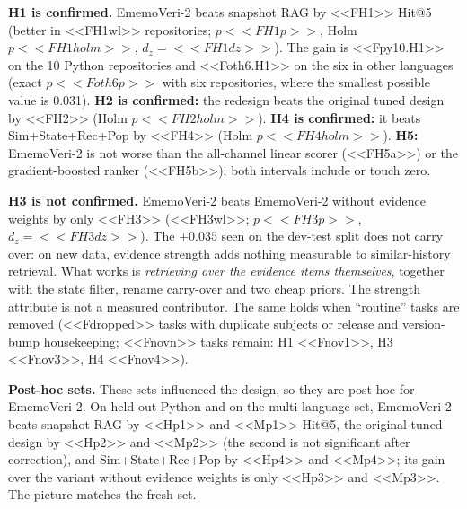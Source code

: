 \documentclass[conference]{IEEEtran}
\newcommand{\sys}{EmemoVeri}
\begin{document}
\textbf{H1 is confirmed.} \sys{}-2 beats snapshot RAG by <<FH1>> Hit@5 (better in <<FH1wl>> repositories; $p<<FH1p>>$, Holm $p<<FH1holm>>$, $d_z=<<FH1dz>>$). The gain is <<Fpy10.H1>> on the 10 Python repositories and <<Foth6.H1>> on the six in other languages (exact $p<<Foth6p>>$ with six repositories, where the smallest possible value is 0.031). \textbf{H2 is confirmed:} the redesign beats the original tuned design by <<FH2>> (Holm $p<<FH2holm>>$). \textbf{H4 is confirmed:} it beats Sim+State+Rec+Pop by <<FH4>> (Holm $p<<FH4holm>>$). \textbf{H5:} \sys{}-2 is not worse than the all-channel linear scorer (<<FH5a>>) or the gradient-boosted ranker (<<FH5b>>); both intervals include or touch zero.

\textbf{H3 is not confirmed.} \sys{}-2 beats \sys{}-2 without evidence weights by only <<FH3>> (<<FH3wl>>; $p<<FH3p>>$, $d_z=<<FH3dz>>$). The $+0.035$ seen on the dev-test split does not carry over: on new data, evidence strength adds nothing measurable to similar-history retrieval. What works is \emph{retrieving over the evidence items themselves}, together with the state filter, rename carry-over and two cheap priors. The strength attribute is not a measured contributor. The same holds when ``routine'' tasks are removed (<<Fdropped>> tasks with duplicate subjects or release and version-bump housekeeping; <<Fnovn>> tasks remain: H1 <<Fnov1>>, H3 <<Fnov3>>, H4 <<Fnov4>>).

\begin{table}[t]\centering\footnotesize\setlength{\tabcolsep}{4pt}
\resizebox{0.97\textwidth}{!}{}
\caption{All systems, frozen, on the 16 fresh repositories (macro-average over repositories; koa is at ceiling for every system), and Hit@5 on the other sets. Held-out and multi-language results are post hoc for \sys{}-2.}
\label{tab:systems}
\end{table}

\begin{table}[t]\centering\footnotesize\setlength{\tabcolsep}{4pt}
\resizebox{0.97\textwidth}{!}{}
\caption{Contrasts stated in advance, fresh set (unit: repository, $n=16$). W/L: repositories where \sys{}-2 is better / worse (ties omitted). Last columns: $\Delta$Hit@5 on the 10 Python and the 6 other-language repositories. With 16 repositories the smallest exact $p$ is $3\times10^{-5}$.}
\label{tab:contrasts}
\end{table}

\textbf{Post-hoc sets.} These sets influenced the design, so they are post hoc for \sys{}-2. On held-out Python and on the multi-language set, \sys{}-2 beats snapshot RAG by <<Hp1>> and <<Mp1>> Hit@5, the original tuned design by <<Hp2>> and <<Mp2>> (the second is not significant after correction), and Sim+State+Rec+Pop by <<Hp4>> and <<Mp4>>; its gain over the variant without evidence weights is only <<Hp3>> and <<Mp3>>. The picture matches the fresh set.
\end{document}
